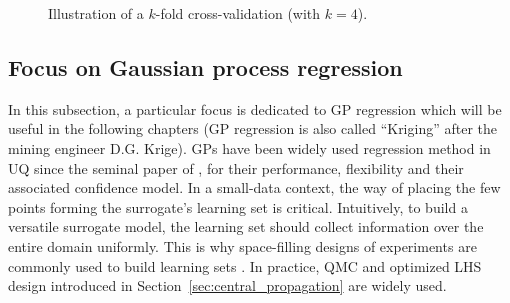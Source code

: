 
\begin{figure}[ht]
    \centering
      \caption{Illustration of a $k$-fold cross-validation (with $k=4$).} 
      \label{fig:kfold}
\end{figure}



\subsection{Focus on Gaussian process regression}

In this subsection, a particular focus is dedicated to GP regression which will be useful in the following chapters (GP regression is also called ``Kriging'' after the mining engineer D.G. Krige). 
GPs have been widely used regression method in UQ since the seminal paper of \citep{sacks_1989}, for their performance, flexibility and their associated confidence model. 
In a small-data context, the way of placing the few points forming the surrogate's learning set is critical. 
Intuitively, to build a versatile surrogate model, the learning set should collect information over the entire domain uniformly. 
This is why space-filling designs of experiments are commonly used to build learning sets \citep{fang_li_2006}. 
In practice, QMC and optimized LHS design introduced in Section~\ref{sec:central_propagation} are widely used.  

